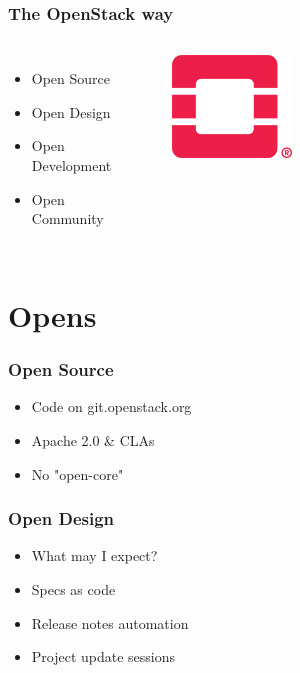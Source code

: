 \documentclass[aspectratio=169,11pt,hyperref={colorlinks=true}]{beamer}
\begin{document}
\begin{frame}
  \frametitle{The OpenStack way}
  \begin{columns}
      \begin{itemize}
          \item{Open Source}
          \item{Open Design}
          \item{Open Development}
          \item{Open Community}
      \end{itemize}
      \begin{figure}
      \begin{center}
        \includegraphics[width=0.4\textwidth]{pictures/OpenStack-Logo-Mark.png}
      \end{center}
      \end{figure}
  \end{columns}
\end{frame}

\section{Opens}
\begin{frame}
  \frametitle{Open Source}
    \begin{itemize}
        \item{Code on git.openstack.org}
        \item{Apache 2.0 \& CLAs}
        \item{No "open-core"}
    \end{itemize}
\end{frame}

\begin{frame}
  \frametitle{Open Design}
    \begin{itemize}
        \item{What may I expect?}
    \end{itemize}
    \begin{itemize}
        \item{Specs as code}
        \item{Release notes automation}
        \item{Project update sessions}
    \end{itemize}
\end{frame}
\end{document}
